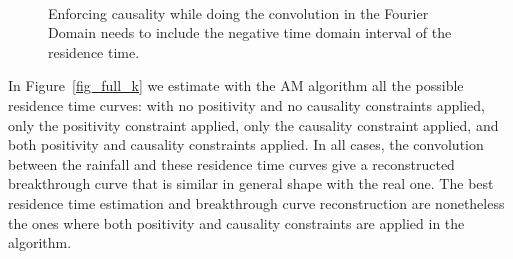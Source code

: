 \documentclass[]{elsarticle} %
\begin{document}
\begin{figure}[H]
    \centering
    \\
    \caption{Enforcing causality while doing the convolution in the Fourier Domain needs to include the negative time domain interval of the residence time.}
    \label{fig_causal_nocausal}
\end{figure}

In Figure~\ref{fig_full_k} we estimate with the AM algorithm all the possible residence time curves: with no positivity and no causality constraints applied, only the positivity constraint applied, only the causality constraint applied, and both positivity and causality constraints applied. In all cases, the convolution between the rainfall and these residence time curves give a reconstructed breakthrough curve that is similar in general shape with the real one. The best residence time estimation and breakthrough curve reconstruction are nonetheless the ones where both positivity and causality constraints are applied in the algorithm.
\end{document}
